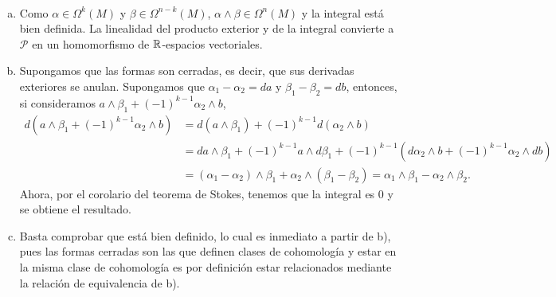 \documentclass[twoside]{article}
\begin{document}
\begin{solucion}\
\begin{enumerate}[a)]
\item Como $\alpha\in\Omega^k(M)$ y $\beta\in\Omega^{n-k}(M)$, $\alpha\land\beta\in\Omega^n(M)$ y la integral está bien definida. La linealidad del producto exterior y de la integral convierte a $\mathcal{P}$ en un homomorfismo de $\mathbb{R}$-espacios vectoriales.
\item Supongamos que las formas son cerradas, es decir, que sus derivadas exteriores se anulan. Supongamos que $\alpha_1-\alpha_2=da$ y $\beta_1-\beta_2=db$, entonces, si consideramos $a\land β_1 + (-1)^{k-1} α_2\land b$,
\begin{align*}
d(a\land β_1 + (-1)^{k-1} α_2\land b)&=d(a\land β_1)+ (-1)^{k-1}d(α_2\land b)\\
&=da\land\beta_1+(-1)^{k-1} a\land d\beta_1+(-1)^{k-1} (d\alpha_2\land b+(-1)^{k-1}\alpha_2\land db)\\
&=(\alpha_1-\alpha_2)\land \beta_1+\alpha_2\land (\beta_1-\beta_2)=\alpha_1\land\beta_1-\alpha_2\land\beta_2.
\end{align*}
Ahora, por el corolario del teorema de Stokes, tenemos que la integral es 0 y se obtiene el resultado.
\item Basta comprobar que está bien definido, lo cual es inmediato a partir de b), pues las formas cerradas son las que definen clases de cohomología y estar en la misma clase de cohomología es por definición estar relacionados mediante la relación de equivalencia de b).
\end{enumerate}
\end{solucion}
\end{document}
